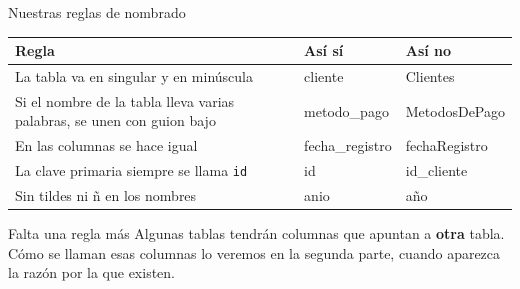 \documentclass[aspectratio=169,10pt,c]{beamer}
\begin{document}
\begin{frame}{Nuestras reglas de nombrado}
\begin{center}
\small
\begin{tabular}{>{\raggedright\arraybackslash}p{5.5cm}>{\ttfamily}p{2.8cm}>{\ttfamily}p{2.9cm}}
\toprule
\bfseries Regla & \normalfont\bfseries Así sí & \normalfont\bfseries Así no \\
\midrule
La tabla va en singular y en minúscula & cliente & Clientes \\
Si el nombre de la tabla lleva varias palabras, se unen con guion bajo & metodo\_pago & MetodosDePago \\
En las columnas se hace igual & fecha\_registro & fechaRegistro \\
La clave primaria siempre se llama \texttt{id} & id & id\_cliente \\
Sin tildes ni ñ en los nombres & anio & año \\
\bottomrule
\end{tabular}
\end{center}
\vspace{0.35cm}
\begin{block}{Falta una regla más}
\small Algunas tablas tendrán columnas que apuntan a \textbf{otra} tabla. Cómo se llaman esas columnas lo veremos en la segunda parte, cuando aparezca la razón por la que existen.
\end{block}
\end{frame}
\end{document}
